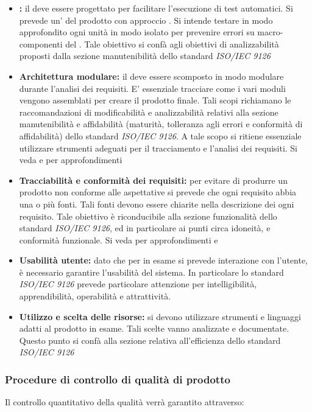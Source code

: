 \documentclass[12pt,a4paper]{article}
\begin{document}
\begin{itemize}
	\item \textbf{:} il  deve essere progettato per facilitare l'esecuzione di test automatici. Si prevede un'  del prodotto con approccio . Si intende testare in modo approfondito ogni unità  in modo isolato per prevenire errori su macro-componenti del . Tale obiettivo si confà agli obiettivi di analizzabilità proposti dalla sezione manutenibilità dello standard \textit{ISO/IEC 9126}
	\item \textbf{Architettura modulare:} il  deve essere scomposto in modo modulare durante l'analisi dei requisiti. E' essenziale tracciare come i vari moduli vengono assemblati per creare il prodotto finale. Tali scopi richiamano le raccomandazioni di modificabilità e analizzabilità relativi alla sezione manutenibilità e affidabilità (maturità, tolleranza agli errori e conformità di affidabilità) dello standard \textit{ISO/IEC 9126}. A tale scopo si ritiene essenziale utilizzare strumenti adeguati per il tracciamento e l'analisi dei requisiti. Si veda \NdP{} e \AdR{} per approfondimenti
	\item \textbf{Tracciabilità e conformità dei requisiti:} per evitare di produrre un prodotto non conforme alle aspettative si prevede che ogni requisito  abbia una o più fonti. Tali fonti devono essere chiarite nella descrizione dei ogni requisito. Tale obiettivo è riconducibile alla sezione funzionalità dello standard \textit{ISO/IEC 9126}, ed in particolare ai punti circa idoneità, e conformità funzionale. Si veda per approfondimenti \NdP{} e \AdR{}
	\item \textbf{Usabilità utente:} dato che per  in esame si prevede interazione con l'utente, è necessario garantire l'usabilità del sistema. In particolare lo standard \textit{ISO/IEC 9126} prevede particolare attenzione per intelligibilità, apprendibilità, operabilità e attrattività.
	\item \textbf{Utilizzo e scelta delle risorse:} si devono utilizzare strumenti e linguaggi adatti al prodotto in esame. Tali scelte vanno analizzate e documentate. Questo punto si confà alla sezione relativa all'efficienza dello standard \textit{ISO/IEC 9126}
\end{itemize}

\subsubsection{Procedure di controllo di qualità di prodotto}
\label{sec:procedure-di-controllo-di-qualità-di-prodotto}
Il controllo quantitativo della qualità verrà garantito attraverso:
\end{document}
